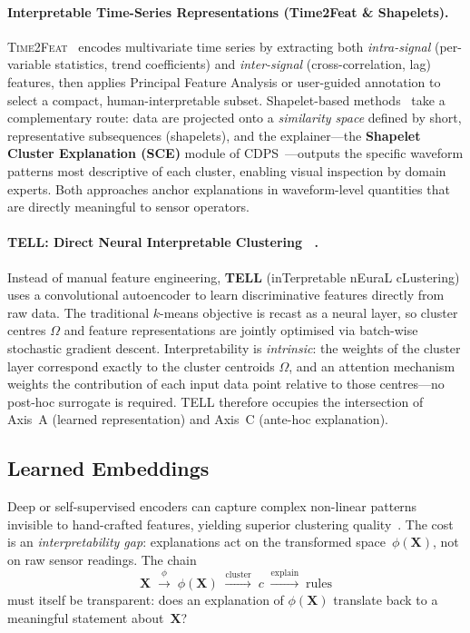 \documentclass{article}
\theoremstyle{plain}
\theoremstyle{definition}
\theoremstyle{remark}
\begin{document}
\paragraph{Interpretable Time-Series Representations
(Time2Feat \& Shapelets).}
\textsc{Time2Feat}~\cite{bonifati_time2feat_2022} encodes multivariate time series by
extracting both \emph{intra-signal} (per-variable statistics, trend
coefficients) and \emph{inter-signal} (cross-correlation, lag) features,
then applies Principal Feature Analysis or user-guided annotation to
select a compact, human-interpretable subset.
Shapelet-based methods~\cite{ye_time_2009} take a complementary route:
data are projected onto a \emph{similarity space} defined by short,
representative subsequences (shapelets), and the explainer---the
\textbf{Shapelet Cluster Explanation (SCE)} module of
CDPS~\cite{elamouri_constrained_2023}---outputs the specific waveform patterns most
descriptive of each cluster, enabling visual inspection by domain experts.
Both approaches anchor explanations in waveform-level quantities that
are directly meaningful to sensor operators.

\paragraph{TELL: Direct Neural Interpretable Clustering ~\cite{peng_xai_2022}.}
Instead of manual feature engineering, \textbf{TELL} (inTerpretable
nEuraL cLustering) uses a convolutional autoencoder to learn
discriminative features directly from raw data. The traditional $k$-means
objective is recast as a neural layer, so cluster centres $\Omega$ and
feature representations are jointly optimised via batch-wise stochastic
gradient descent. Interpretability is \emph{intrinsic}: the weights of
the cluster layer correspond exactly to the cluster centroids $\Omega$,
and an attention mechanism weights the contribution of each input
data point relative to those centres---no post-hoc surrogate is
required. TELL therefore occupies the intersection of Axis~A (learned
representation) and Axis~C (ante-hoc explanation).

\subsection{Learned Embeddings}

Deep or self-supervised encoders can capture complex non-linear patterns
invisible to hand-crafted features, yielding superior clustering
quality~\cite{aljalbout_clustering_2018}. The cost is an \emph{interpretability
gap}: explanations act on the transformed space~$\phi(\mathbf{X})$, not
on raw sensor readings. The chain
\[
  \mathbf{X} \;\xrightarrow{\phi}\; \phi(\mathbf{X})
  \;\xrightarrow{\text{cluster}}\; c
  \;\xrightarrow{\text{explain}}\; \text{rules}
\]
must itself be transparent: does an explanation of $\phi(\mathbf{X})$
translate back to a meaningful statement about~$\mathbf{X}$?
\end{document}
